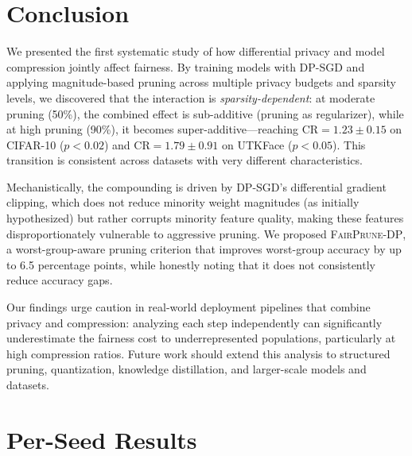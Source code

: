 \documentclass{article}
\newcommand{\CR}{\text{CR}}
\newcommand{\FairPrunDP}{\textsc{FairPrune-DP}}
\begin{document}
\section{Conclusion}
\label{sec:conclusion}

We presented the first systematic study of how differential privacy and model compression jointly affect fairness. By training models with DP-SGD and applying magnitude-based pruning across multiple privacy budgets and sparsity levels, we discovered that the interaction is \emph{sparsity-dependent}: at moderate pruning (50\%), the combined effect is sub-additive (pruning as regularizer), while at high pruning (90\%), it becomes super-additive---reaching $\CR = 1.23 \pm 0.15$ on CIFAR-10 ($p < 0.02$) and $\CR = 1.79 \pm 0.91$ on UTKFace ($p < 0.05$). This transition is consistent across datasets with very different characteristics.

Mechanistically, the compounding is driven by DP-SGD's differential gradient clipping, which does not reduce minority weight magnitudes (as initially hypothesized) but rather corrupts minority feature quality, making these features disproportionately vulnerable to aggressive pruning. We proposed \FairPrunDP{}, a worst-group-aware pruning criterion that improves worst-group accuracy by up to 6.5 percentage points, while honestly noting that it does not consistently reduce accuracy gaps.

Our findings urge caution in real-world deployment pipelines that combine privacy and compression: analyzing each step independently can significantly underestimate the fairness cost to underrepresented populations, particularly at high compression ratios. Future work should extend this analysis to structured pruning, quantization, knowledge distillation, and larger-scale models and datasets.





\newpage
\appendix
\section{Per-Seed Results}
\label{app:per_seed}
\end{document}
